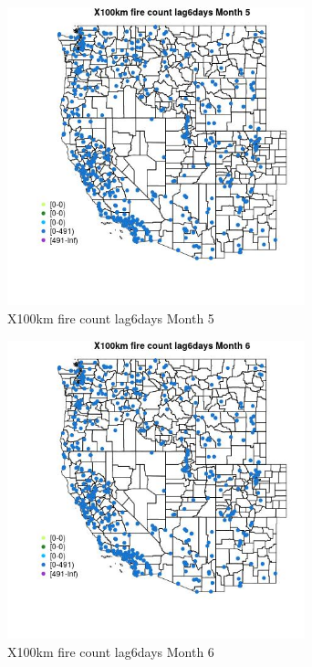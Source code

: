 \begin{figure} 
\centering  
\includegraphics[width=0.77\textwidth]{Code_Outputs/Report_ML_input_PM25_Step4_part_e_de_duplicated_aves_compiled_2019-05-14wNAs_MapObsMo5X100km_fire_count_lag6days.jpg} 
\caption{\label{fig:Report_ML_input_PM25_Step4_part_e_de_duplicated_aves_compiled_2019-05-14wNAsMapObsMo5X100km_fire_count_lag6days}X100km fire count lag6days Month 5} 
\end{figure} 
 

\begin{figure} 
\centering  
\includegraphics[width=0.77\textwidth]{Code_Outputs/Report_ML_input_PM25_Step4_part_e_de_duplicated_aves_compiled_2019-05-14wNAs_MapObsMo6X100km_fire_count_lag6days.jpg} 
\caption{\label{fig:Report_ML_input_PM25_Step4_part_e_de_duplicated_aves_compiled_2019-05-14wNAsMapObsMo6X100km_fire_count_lag6days}X100km fire count lag6days Month 6} 
\end{figure} 
 

